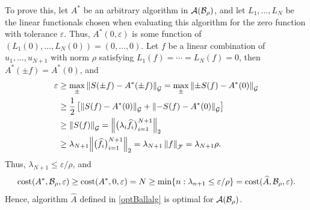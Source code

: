 \documentclass[graybox,footinfo]{svmult}
\newcommand{\DHJRnorm}[2][{}]{\ensuremath{\left \lVert #2 \right \rVert}_{#1}}
\newcommand{\DHJRBignorm}[2][{}]{\ensuremath{\Bigl \lVert #2 \Bigr \rVert}_{#1}}
\begin{document}
To prove this, let $A^*$ be an arbitrary algorithm in ${\mathcal{A}}({\mathcal{B}}_{\rho})$, and let $L_1, \ldots, L_N$ be the linear functionals chosen when evaluating this algorithm for the zero function with tolerance $\varepsilon$.  Thus, $A^*(0,\varepsilon)$ is some function of $(L_1(0) , \ldots, L_N(0)) = (0, \ldots, 0)$.  Let $f$ be a linear combination of $u_1, \ldots, u_{N+1}$ with norm $\rho$ satisfying  $L_1(f) = \cdots = L_N(f) = 0$, then $A^*(\pm f) = A^*(0)$, and
\begin{align*}
\varepsilon & \ge \max_{\pm} \DHJRnorm[\calG]{S(\pm f) - A^*(\pm f)} =  \max_{\pm} \DHJRnorm[\calG]{\pm S( f) - A^*(0)} \\
& \ge \frac 12 \left [ \DHJRnorm[\calG]{S( f) - A^*(0)} + \DHJRnorm[\calG]{- S( f) - A^*(0)}\right] \\
& \ge \DHJRnorm[\calG]{S(f)} 
= \DHJRBignorm[2]{\big(\lambda_i\widehat{f}_i\big)_{i=1}^{N+1}} \\
& \ge \lambda_{N+1} \DHJRBignorm[2]{\big(\widehat{f}_i\big)_{i=1}^{N+1}} = \lambda_{N+1} \DHJRnorm[\calF]{f} = \lambda_{N+1} \rho.
\end{align*}
Thus, $\lambda_{N+1} \le \varepsilon/\rho$, and 
\[
\textup{cost}(A^*,{\mathcal{B}}_\rho,\varepsilon) \ge \textup{cost}(A^*,0,\varepsilon)  = N \ge \min\{ n : \lambda_{n+1} \le \varepsilon/\rho \} = \textup{cost}(\widehat{A},{\mathcal{B}}_\rho,\varepsilon).
\]
Hence, algorithm $\widehat{A}$ defined in \eqref{optBallalg} is optimal for ${\mathcal{A}}({\mathcal{B}}_{\rho})$.
\end{document}
